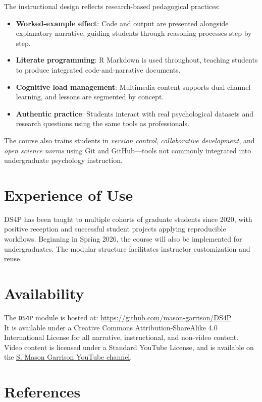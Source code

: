 \documentclass[10pt,a4paper,onecolumn]{article}
\providecommand{\tightlist}{%
  \setlength{\itemsep}{0pt}\setlength{\parskip}{0pt}}
\begin{document}
The instructional design reflects research-based pedagogical practices:

\begin{itemize}
\tightlist
\item
  \textbf{Worked-example effect}: Code and output are presented
  alongside explanatory narrative, guiding students through reasoning
  processes step by step.
\item
  \textbf{Literate programming}: R Markdown is used throughout, teaching
  students to produce integrated code-and-narrative documents.
\item
  \textbf{Cognitive load management}: Multimedia content supports
  dual-channel learning, and lessons are segmented by concept.
\item
  \textbf{Authentic practice}: Students interact with real psychological
  datasets and research questions using the same tools as professionals.
\end{itemize}

The course also trains students in \emph{version control},
\emph{collaborative development}, and \emph{open science norms} using
Git and GitHub---tools not commonly integrated into undergraduate
psychology instruction.

\section{Experience of Use}\label{experience-of-use}

DS4P has been taught to multiple cohorts of graduate students since
2020, with positive reception and successful student projects applying
reproducible workflows. Beginning in Spring 2026, the course will also
be implemented for undergraduates. The modular structure facilitates
instructor customization and reuse.

\section{Availability}\label{availability}

The \texttt{DS4P} module is hosted at:
\url{https://github.com/mason-garrison/DS4P}\\
It is available under a Creative Commons Attribution-ShareAlike 4.0
International License for all narrative, instructional, and non-video
content. Video content is licensed under a Standard YouTube License, and
is available on the \href{https://www.youtube.com/@smasongarrison}{S.
Mason Garrison YouTube channel}.

\section{References}\label{references}
\end{document}

